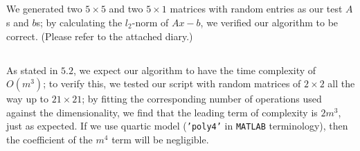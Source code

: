 \documentclass[11pt]{article}
\begin{document}
\subsection{}
We generated two $5\times5$ and two $5\times1$ matrices with random entries as our test $A$s and $b$s; by calculating the $l_2$-norm of $Ax-b$, we verified our algorithm to be correct. (Please refer to the attached diary.)

\subsection{}
As stated in $5.2$, we expect our algorithm to have the time complexity of $O(m^3)$; to verify this, we tested our script with random matrices of $2\times2$ all the way up to $21\times21$; by fitting the corresponding number of operations used against the dimensionality, we find that the leading term of complexity is $2m^3$, just as expected. If we use quartic model (\texttt{'poly4'} in \texttt{MATLAB} terminology), then the coefficient of the $m^4$ term will be negligible. 

\newpage
\appendix{}
\end{document}
